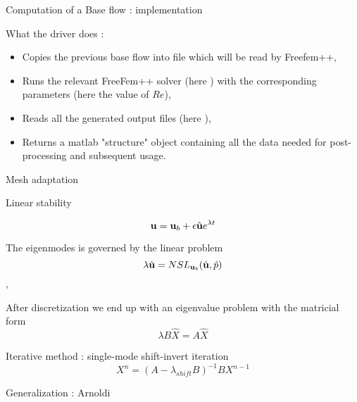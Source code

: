 \documentclass{beamer}
\newcommand{\be}[1]{ \begin{equation} \label{#1}}
\newcommand{\ee}{\end{equation}}
\newcommand{\ssp}{\vspace{.2cm} }
\begin{document}
\begin{frame}{Computation of a Base flow : implementation}

\small






\ssp

What the  driver does :

\begin{itemize}[<+->]
\item Copies the previous base flow  into file  which will be read by Freefem++,

\item Runs the relevant FreeFem++ solver (here )  with the corresponding parameters (here the value of $Re$),


\item Reads all the generated output files (here ), 

\item Returns a matlab "structure" object containing all the data needed for post-processing and subsequent usage.
 
\end{itemize}

\end{frame}

\begin{frame}{Mesh adaptation}


\end{frame}



\begin{frame}{Linear stability}

\be{startmodepropre}
{\bf u} = {\bf u}_b + \epsilon \hat{\bf u} e^{\lambda t} 
\ee

The eigenmodes is governed by the linear problem 
$$\lambda \hat{{\bf u}} = NSL_{{\bf u}_b}( \hat{\bf u},\hat{p})$$,

After discretization we end up with an eigenvalue problem with the matricial form
\be{Eigen_matricial}
\lambda B \hat{X} = A \hat{X}
\ee

\ssp
Iterative method : single-mode shift-invert iteration
$$
X^{n} =  (A- \lambda_{shift} B)^{-1} B X^{n-1}
$$ 

Generalization : Arnoldi

\end{frame}
\end{document}
